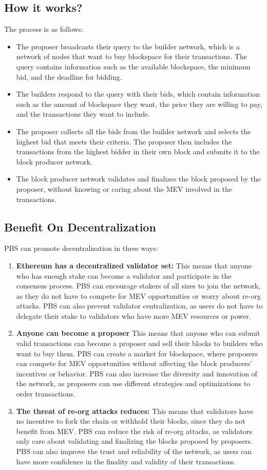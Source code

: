 \documentclass{report}
\begin{document}
\subsection{How it works?}
The process is as follows:
\begin{itemize}
	\item The proposer broadcasts their query to the builder network, which is a network of nodes that want to buy blockspace for their transactions. The query contains information such as the available blockspace, the minimum bid, and the deadline for bidding.
	\item The builders respond to the query with their bids, which contain information such as the amount of blockspace they want, the price they are willing to pay, and the transactions they want to include.
	\item The proposer collects all the bids from the builder network and selects the highest bid that meets their criteria. The proposer then includes the transactions from the highest bidder in their own block and submits it to the block producer network.
	\item The block producer network validates and finalizes the block proposed by the proposer, without knowing or caring about the MEV involved in the transactions.
\end{itemize}
\subsection{Benefit On Decentralization}
PBS can promote decentralization in three ways:\\
\begin{enumerate}
	\item \textbf{Ethereum has a decentralized validator set:} This means that anyone who has enough stake can become a validator and participate in the consensus process. PBS can encourage stakers of all sizes to join the network, as they do not have to compete for MEV opportunities or worry about re-org attacks. PBS can also prevent validator centralization, as users do not have to delegate their stake to validators who have more MEV resources or power.
	\item \textbf{Anyone can become a proposer} This means that anyone who can submit valid transactions can become a proposer and sell their blocks to builders who want to buy them. PBS can create a market for blockspace, where proposers can compete for MEV opportunities without affecting the block producers’ incentives or behavior. PBS can also increase the diversity and innovation of the network, as proposers can use different strategies and optimizations to order transactions.
	\item \textbf{The threat of re-org attacks reduces:} This means that validators have no incentive to fork the chain or withhold their blocks, since they do not benefit from MEV. PBS can reduce the risk of re-org attacks, as validators only care about validating and finalizing the blocks proposed by proposers. PBS can also improve the trust and reliability of the network, as users can have more confidence in the finality and validity of their transactions.
\end{enumerate}
\end{document}
